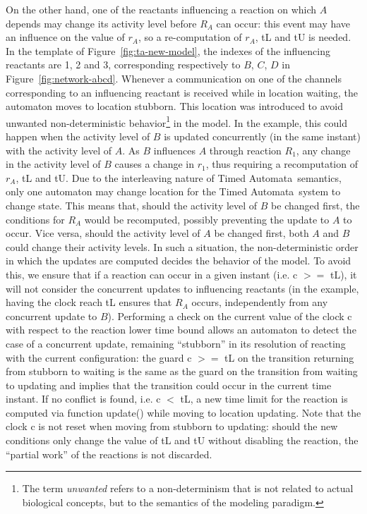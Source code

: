 \documentclass{llncs}
\newcommand{\tas}{Timed Automata}
\begin{document}
On the other hand, one of the reactants influencing a reaction on which $A$ depends may change its activity level
before $R_A$ can occur: this event may have an influence on the value of $r_A$, so a re-computation
of $r_A$, {\sf tL} and {\sf tU} is needed.
In the template of Figure~\ref{fig:ta-new-model}, the indexes of the influencing reactants are 1, 2 and 3,
corresponding respectively to $B$, $C$, $D$ in Figure~\ref{fig:network-abcd}.
Whenever a communication on one of the channels corresponding to an influencing
reactant is received while in location {\sf waiting}, the automaton moves to location
{\sf stubborn}. This location was introduced to avoid unwanted non-deterministic behavior\footnote{The term \emph{unwanted}
refers to a non-determinism that is not related to actual biological concepts, but to the semantics of the modeling
paradigm.} in the model.
In the example, this could happen when the activity level of $B$ is updated concurrently (in the same instant) with the activity level of $A$.
As $B$ influences $A$ through reaction $R_1$, any change in the activity level of $B$ causes a change in $r_1$, thus
requiring a recomputation of $r_A$, {\sf tL} and {\sf tU}. Due to the interleaving nature of \tas\ semantics, only one automaton
may change location for the \tas\ system to change state. This means that, should the activity level of $B$ be changed
first, the conditions for $R_A$ would be recomputed, possibly preventing the update to $A$ to occur. Vice versa, should the activity
level of $A$ be changed first, both $A$ and $B$ could change their activity levels.
In such a situation, the non-deterministic order in which the updates are computed decides the behavior of the model.
To avoid this, we ensure that if a reaction can occur in a given instant (i.e. {\sf c $>=$ tL}), it will not
consider the concurrent updates to influencing reactants (in the example, having the clock reach {\sf tL} ensures that $R_A$ occurs,
independently from any concurrent update to $B$).
Performing a check on the current value of the clock {\sf c} with respect to the reaction lower time bound allows
an automaton to detect the case of a concurrent update, remaining ``stubborn'' in its resolution
of reacting with the current configuration: the guard {\sf c $>=$ tL} on
the transition returning from {\sf stubborn} to {\sf waiting}
is the same as the guard on the transition from {\sf waiting} to {\sf updating} and
implies that the transition could occur in the current time instant.
If no conflict is found, i.e. {\sf c $<$ tL}, a new time limit for the reaction is
computed via function {\sf update()} while moving to location {\sf updating}. Note that the clock {\sf c} is not reset
when moving from {\sf stubborn} to {\sf updating}: should the new conditions only change the value of {\sf tL} and {\sf tU}
without disabling the reaction, the ``partial work'' of the reactions is not discarded.
\end{document}
